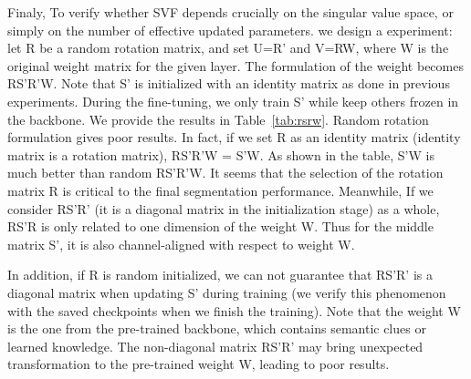 \documentclass{article}
\begin{document}
Finaly, To verify whether SVF depends crucially on the singular value space, or simply on the number of effective updated parameters. we design a experiment: let R be a random rotation matrix, and set U=R' and V=RW, where W is the original weight matrix for the given layer. The formulation of the weight becomes RS'R'W. Note that S’ is initialized with an identity matrix as done in previous experiments. During the fine-tuning, we only train S’ while keep others frozen in the backbone. We provide the results in Table~\ref{tab:rsrw}. Random rotation formulation gives poor results. In fact, if we set R as an identity matrix (identity matrix is a rotation matrix), RS'R'W = S'W. As shown in the table, S'W is much better than random RS'R'W. It seems that the selection of the rotation matrix R is critical to the final segmentation performance. Meanwhile, If we consider RS’R’ (it is a diagonal matrix in the initialization stage) as a whole, RS'R is only related to one dimension of the weight W. Thus for the middle matrix S', it is also channel-aligned with respect to weight W.

In addition, if R is random initialized, we can not guarantee that RS'R' is a diagonal matrix when updating S' during training (we verify this phenomenon with the saved checkpoints when we finish the training). Note that the weight W is the one from the pre-trained backbone, which contains semantic clues or learned knowledge. The non-diagonal matrix RS'R' may bring unexpected transformation to the pre-trained weight W, leading to poor results.



 
\end{document}
